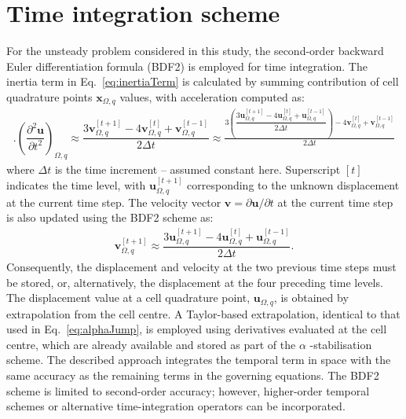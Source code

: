 \documentclass[review,3p]{elsarticle}
\newcommand{\bb}{\boldsymbol}
\begin{document}
\section{Time integration scheme}
\label{app:time}
%
%
For the unsteady problem considered in this study, the second-order backward Euler differentiation formula (BDF2) is employed for time integration. The inertia term in Eq.~\eqref{eq:inertiaTerm} is calculated by summing contribution of cell quadrature points $\bb{x}_{\Omega, q}$ values, with acceleration computed as:
%
\begin{eqnarray} \label{eq:inertia2}. 	\left(\dfrac{\partial^2 \boldsymbol{u}}{\partial t^2}\right)_{\Omega, q}
	\approx
	\dfrac{3\boldsymbol{v}_{\Omega, q}^{[t+1]} - 4\boldsymbol{v}_{\Omega, q}^{[t]} + \boldsymbol{v}_{\Omega, q}^{[t-1]}}{2\Delta t}
	\approx
	\frac{3\left(
		\dfrac{3\boldsymbol{u}_{\Omega, q}^{[t+1]} - 4\boldsymbol{u}_{\Omega, q}^{[t]} + \boldsymbol{u}_{\Omega, q}^{[t-1]}}{2\Delta t}
		\right)
		- 4\boldsymbol{v}_{\Omega, q}^{[t]} + \boldsymbol{v}_{\Omega, q}^{[t-1]}}{2\Delta t}
\end{eqnarray}
%
where $\Delta t$ is the time increment -- assumed constant here.
Superscript $[t]$ indicates the time level, with $\bb{u}_{\Omega, q}^{[t+1]}$ corresponding to the unknown displacement at the current time step.
The velocity vector $\bb{v} = \partial \bb{u}/\partial t$ at the current time step is also updated using the BDF2 scheme as:
%
\begin{eqnarray}
	\boldsymbol{v}_{\Omega, q}^{[t+1]}	\approx
	\dfrac{3\boldsymbol{u}_{\Omega, q}^{[t+1]} - 4\boldsymbol{u}_{\Omega, q}^{[t]} + \boldsymbol{u}_{\Omega, q}^{[t-1]}}{2\Delta t}.
\end{eqnarray}
%
Consequently, the displacement and velocity at the two previous time steps must be stored, or, alternatively, the displacement at the four preceding time levels.
The displacement value at a cell quadrature point, $\boldsymbol{u}_{\Omega,q}$, is obtained by extrapolation from the cell centre. A Taylor-based extrapolation, identical to that used in Eq.~\eqref{eq:alphaJump}, is employed using derivatives evaluated at the cell centre, which are already available and stored as part of the $\alpha$ -stabilisation scheme. 
The described approach integrates the temporal term in space with the same accuracy as the remaining terms in the governing equations. The BDF2 scheme is limited to second-order accuracy; however, higher-order temporal schemes or alternative time-integration operators \cite{Costa2022b} can be incorporated.
%
%
\end{document}
